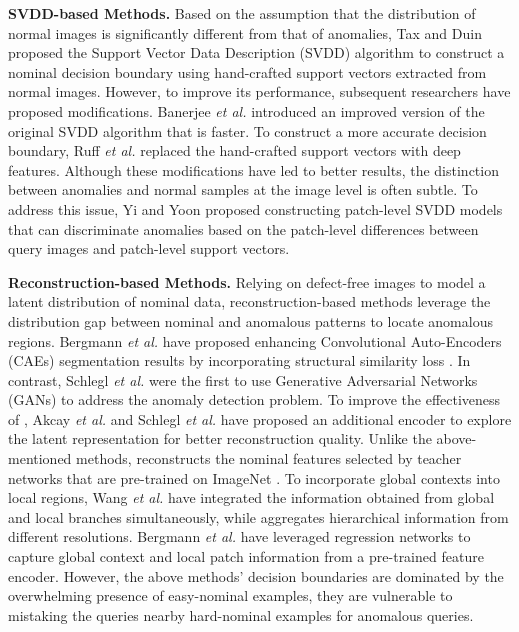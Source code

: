 \documentclass[default,iicol]{sn-jnl}\usepackage[algo2e,ruled,linesnumbered]{algorithm2e}
\theoremstyle{thmstyleone}\newtheorem{theorem}{Theorem}\newtheorem{proposition}[theorem]{Proposition}
\theoremstyle{thmstyletwo}\newtheorem{example}{Example}\newtheorem{remark}{Remark}
\theoremstyle{thmstylethree}\newtheorem{definition}{Definition}
\begin{document}
\noindent\textbf{SVDD-based Methods. }
Based on the assumption that the distribution of normal images is significantly different from that of anomalies, Tax and Duin \cite{SVDD} proposed the Support Vector Data Description (SVDD) algorithm to construct a nominal decision boundary using hand-crafted support vectors extracted from normal images.
However, to improve its performance, subsequent researchers have proposed modifications.
Banerjee \emph{et al.} \cite{fSVDD} introduced an improved version of the original SVDD algorithm that is faster.
To construct a more accurate decision boundary, Ruff \emph{et al.} \cite{DSVDD} replaced the hand-crafted support vectors with deep features.
Although these modifications have led to better results, the distinction between anomalies and normal samples at the image level is often subtle.
To address this issue, Yi and Yoon \cite{psvdd} proposed constructing patch-level SVDD models that can discriminate anomalies based on the patch-level differences between query images and patch-level support vectors.

\noindent\textbf{Reconstruction-based Methods. }
Relying on defect-free images to model a latent distribution of nominal data, reconstruction-based methods leverage the distribution gap between nominal and anomalous patterns to locate anomalous regions.
Bergmann \emph{et al.} \cite{SSIM-AE} have proposed enhancing Convolutional Auto-Encoders (CAEs) \cite{CAE} segmentation results by incorporating structural similarity loss \cite{SSIM}.
In contrast, Schlegl \emph{et al.} \cite{AnoGAN} were the first to use Generative Adversarial Networks (GANs) \cite{GAN} to address the anomaly detection problem.
To improve the effectiveness of \cite{AnoGAN}, Akcay \emph{et al.} \cite{AUROC} and Schlegl \emph{et al.} \cite{F-AnoGan} have proposed an additional encoder to explore the latent representation for better reconstruction quality.
Unlike the above-mentioned methods, \cite{US} reconstructs the nominal features selected by teacher networks that are pre-trained on ImageNet \cite{imagenet}.
To incorporate global contexts into local regions, Wang \emph{et al.} \cite{GLFC} have integrated the information obtained from global and local branches simultaneously, while \cite{MKD} aggregates hierarchical information from different resolutions. Bergmann \emph{et al.} \cite{MVTECLOCO} have leveraged regression networks to capture global context and local patch information from a pre-trained feature encoder.
However, the above methods' decision boundaries are dominated by the overwhelming presence of easy-nominal examples, they are vulnerable to mistaking the queries nearby hard-nominal examples for anomalous queries.
\end{document}
